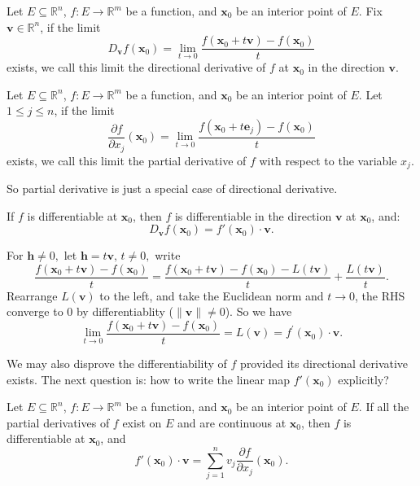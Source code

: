 \begin{definition}
Let $E \subseteq \mathbb{R}^n$, $f: E \to \mathbb{R}^m$ be a function, and $\mathbf{x}_0$ be an interior point of $E$.
Fix $\mathbf{v}\in\mathbb{R}^n$, if the limit
$$D_\mathbf{v} f(\mathbf{x}_0) = \lim_{t \to 0} \frac{f(\mathbf{x}_0 + t\mathbf{v}) - f(\mathbf{x}_0)}{t}$$
exists, we call this limit the directional derivative of $f$ at $\mathbf{x}_0$ in the direction $\mathbf{v}.$
\end{definition}


\begin{definition}
Let $E \subseteq \mathbb{R}^n$, $f: E \to \mathbb{R}^m$ be a function, and $\mathbf{x}_0$ be an interior point of $E$.
Let $1\le j\le n$, if the limit
$$\frac{\partial f}{\partial x_j}(\mathbf{x}_0) = \lim_{t \to 0} \frac{f(\mathbf{x}_0 + t\mathbf{e}_j) - f(\mathbf{x}_0)}{t}$$
exists, we call this limit the partial derivative of $f$ with respect to the variable $x_j$.
\end{definition}

So partial derivative is just a special case of directional derivative.

\begin{theorem}
If $f$ is differentiable at $\mathbf{x}_0$, then $f$ is differentiable in the direction $\mathbf{v}$ at $\mathbf{x}_0$, and:
$$D_\mathbf{v} f(\mathbf{x}_0) = f'(\mathbf{x}_0)\cdot\mathbf{v}.$$
\end{theorem}

\begin{pfbox}

For $\mathbf{h}\ne 0,$ let $\mathbf{h}=t\mathbf{v},\, t\ne 0,$ write
\[
\frac{f(\mathbf{x}_0 + t\mathbf{v})-f(\mathbf{x}_0)}{t} 
= \frac{f(\mathbf{x}_0 + t\mathbf{v})-f(\mathbf{x}_0)-L(t\mathbf{v})}{t}
+ \frac{L(t\mathbf{v})}{t}.
\]
Rearrange $L(\mathbf{v})$ to the left, and take the Euclidean norm and $t\to 0$, the RHS converge to 0 by differentiablity ($\|\mathbf{v}\|\ne 0$). So we have
\[
\lim_{t\to 0}\frac{f(\mathbf{x}_0 + t\mathbf{v})-f(\mathbf{x}_0)}{t} = L(\mathbf{v}) = f^\prime(\mathbf{x}_0)\cdot\mathbf{v}.
\]

\end{pfbox}



We may also disprove the differentiability of $f$ provided its directional derivative exists.
The next question is: how to write the linear map $f'(\mathbf{x}_0)$ explicitly?

\begin{theorem}
Let $E \subseteq \mathbb{R}^n$, $f: E \to \mathbb{R}^m$ be a function, and $\mathbf{x}_0$ be an interior point of $E$.
If all the partial derivatives of $f$ exist on $E$ and are continuous at $\mathbf{x}_0$, then $f$ is differentiable at $\mathbf{x}_0$, and
$$f'(\mathbf{x}_0)\cdot\mathbf{v} = \sum_{j=1}^n v_j \frac{\partial f}{\partial x_j}(\mathbf{x}_0).$$
\end{theorem}


